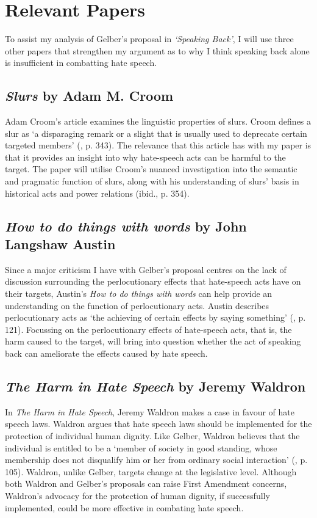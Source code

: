 \documentclass{article}
\begin{document}
\section{Relevant Papers}

To assist my analysis of Gelber’s proposal in \textit{‘Speaking Back’}, I will use three other papers that strengthen my argument as to why I think speaking back alone is insufficient in combatting hate speech.

\subsection*{\textit{Slurs} by Adam M. Croom}

Adam Croom’s article examines the linguistic properties of slurs. Croom defines a slur as ‘a disparaging remark or a slight that is usually used to deprecate certain targeted members' (\cite{croom}, p. 343). The relevance that this article has with my paper is that it provides an insight into why hate-speech acts can be harmful to the target. The paper will utilise Croom’s nuanced investigation into the semantic and pragmatic function of slurs, along with his understanding of slurs’ basis in historical acts and power relations (ibid., p. 354). 

\subsection*{\textit{How to do things with words} by John Langshaw Austin}

Since a major criticism I have with Gelber’s proposal centres on the lack of discussion surrounding the perlocutionary effects that hate-speech acts have on their targets, Austin’s \textit{How to do things with words} can help provide an understanding on the function of perlocutionary acts. Austin describes perlocutionary acts as ‘the achieving of certain effects by saying something’ (\cite{austin}, p. 121). Focussing on the perlocutionary effects of hate-speech acts, that is, the harm caused to the target, will bring into question whether the act of speaking back can ameliorate the effects caused by hate speech.

\subsection*{\textit{The Harm in Hate Speech} by Jeremy Waldron}

In \textit{The Harm in Hate Speech}, Jeremy Waldron makes a case in favour of hate speech laws. Waldron argues that hate speech laws should be implemented for the protection of individual human dignity. Like Gelber, Waldron believes that the individual is entitled to be a ‘member of society in good standing, whose membership does not disqualify him or her from ordinary social interaction' (\cite{waldron}, p. 105). Waldron, unlike Gelber, targets change at the legislative level. Although both Waldron and Gelber’s proposals can raise First Amendment concerns, Waldron’s advocacy for the protection of human dignity, if successfully implemented, could be more effective in combating hate speech. 

\newpage

\printbibliography
\end{document}
